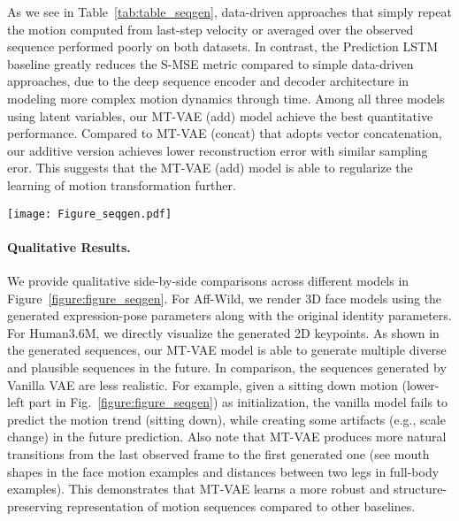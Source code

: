 \documentclass[runningheads]{llncs}
\begin{document}
As we see in Table~\ref{tab:table_seqgen}, data-driven approaches that simply repeat the motion computed from last-step velocity or averaged over the observed sequence performed poorly on both datasets.
In contrast, the Prediction LSTM~\cite{villegas2017learning} baseline greatly reduces the S-MSE metric compared to simple data-driven approaches, due to the deep sequence encoder and decoder architecture in modeling more complex motion dynamics through time.
Among all three models using latent variables, our MT-VAE (add) model achieve the best quantitative performance.
Compared to MT-VAE (concat) that adopts vector concatenation, our additive version achieves lower reconstruction error with similar sampling eror. 
This suggests that the MT-VAE (add) model is able to regularize the learning of motion transformation further.



\begin{figure*}[!h]
\centering
\texttt{[image: Figure\_seqgen.pdf]}
\caption{Multimodal Sequence Generation. 
Given an input sequence (green boundary), we generate future sequences (red boundary).
We predict 32 frames given 8 frames for face motion, and 64 frames given 16 frames for human body motion.
Given the initial frames as condition, we demonstrate (top to bottom) the ground truth sequence, Prediction LSTM, Vanilla VAE, and our MT-VAE model.
Overall, our model produces (1) diverse and structured motion patterns and (2) more natural transitions from the last frame observed to the first frame generated (See the subtle mouth shape and scale change from the last observed frame to the first generated one).
}
\vspace*{-0.2in}
\label{figure:figure_seqgen}
\end{figure*}

\paragraph{Qualitative Results.}
\vspace*{-0.1in}
We provide qualitative side-by-side comparisons across different models in Figure~\ref{figure:figure_seqgen}.
For Aff-Wild, we render 3D face models using the generated expression-pose parameters along with the original identity parameters.
For Human3.6M, we directly visualize the generated 2D keypoints.
As shown in the generated sequences, our MT-VAE model is able to generate multiple diverse and plausible sequences in the future.
In comparison, the sequences generated by Vanilla VAE are less realistic.
For example, given a sitting down motion (lower-left part in Fig.~\ref{figure:figure_seqgen}) as initialization, the vanilla model fails to predict the motion trend (sitting down), while creating some artifacts (e.g., scale change) in the future prediction.
Also note that MT-VAE produces more natural transitions from the last observed frame to the first generated one (see mouth shapes in the face motion examples and distances between two legs in full-body examples).
This demonstrates that MT-VAE learns a more robust and structure-preserving representation of motion sequences compared to other baselines.
\end{document}

